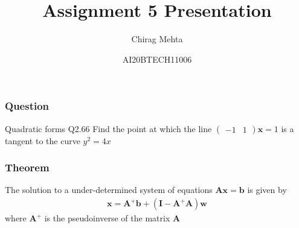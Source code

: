 \documentclass{beamer}
\title{Assignment 5 Presentation}
\author{Chirag Mehta}
\date{AI20BTECH11006}
\newcommand{\myvec}[1]{\ensuremath{\begin{pmatrix}#1\end{pmatrix}}}
\renewcommand{\vec}[1]{\boldsymbol{#1}}
\begin{document}
\begin{frame}
\titlepage
\end{frame}

\begin{frame}
\frametitle{Question}
\begin{block}{Quadratic forms Q2.66}
Find the point at which the line 
$\myvec{-1 & 1}\vec{x}=1$ is a tangent to the curve $y^2=4x$    
\end{block}
\end{frame}

\begin{frame}
\frametitle{Theorem}
\begin{theorem}
    The solution to a under-determined system of equations $\vec{Ax}=\vec{b}$ is given by
    \begin{align}
        \vec{x}=\vec{A}^+\vec{b}+(\vec{I}-\vec{A}^+\vec{A})\vec{w} \label{eq:generalisedInverse}
    \end{align}
    where $\vec{A^+}$ is the pseudoinverse of the matrix $\vec{A}$\\
    \end{theorem}
\end{frame}
\end{document}

